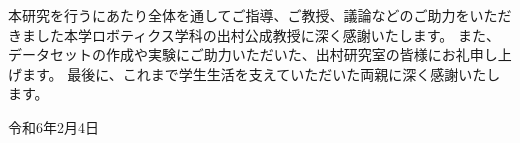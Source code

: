 
本研究を行うにあたり全体を通してご指導、ご教授、議論などのご助力をいただきました本学ロボティクス学科の出村公成教授に深く感謝いたします。
また、データセットの作成や実験にご助力いただいた、出村研究室の皆様にお礼申し上げます。
最後に、これまで学生生活を支えていただいた両親に深く感謝いたします。

\begin{flushright}
令和6年2月4日
\end{flushright}
